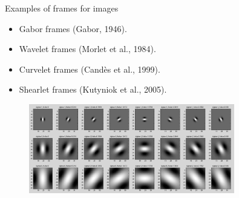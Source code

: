 \begin{frame}{Examples of frames for images}
\begin{itemize}
\item Gabor frames (Gabor, 1946).

\bigskip
\item Wavelet frames (Morlet et al., 1984).

\bigskip
\item Curvelet frames (Cand\`es et al., 1999).

\bigskip

\item Shearlet frames (Kutyniok et al., 2005).
\end{itemize}

\begin{figure}[h!]
\centering
\includegraphics[width=0.8\textwidth, height=0.5\textheight]{./Images/STFTWave.png}
\end{figure}
\end{frame}


